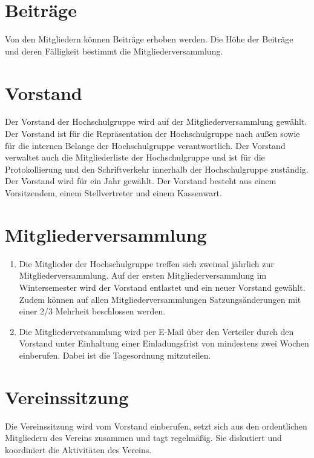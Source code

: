 \documentclass[a4paper]{scrartcl}
\begin{document}
\section{Beiträge}
Von den Mitgliedern können Beiträge erhoben werden. Die Höhe der Beiträge und
deren Fälligkeit bestimmt die Mitgliederversammlung.

\section{Vorstand}
Der Vorstand der Hochschulgruppe wird auf der Mitgliederversammlung gewählt.
Der Vorstand ist für die Repräsentation der Hochschulgruppe nach außen sowie
für die internen Belange der Hochschulgruppe verantwortlich. Der Vorstand
verwaltet auch die Mitgliederliste der Hochschulgruppe und ist für die
Protokollierung und den Schriftverkehr innerhalb der Hochschulgruppe zuständig.
Der Vorstand wird für ein Jahr gewählt. Der Vorstand besteht aus einem
Vorsitzendem, einem Stellvertreter und einem Kassenwart.

\section{Mitgliederversammlung}
\begin{enumerate}
    \item Die Mitglieder der Hochschulgruppe treffen sich zweimal jährlich zur
          Mitgliederversammlung. Auf der ersten Mitgliederversammlung im
          Wintersemester wird der Vorstand entlastet und ein neuer Vorstand
          gewählt. Zudem können auf allen Mitgliederversammlungen
          Satzungsänderungen mit einer 2/3 Mehrheit beschlossen werden.
    \item Die Mitgliederversammlung wird per E-Mail über den Verteiler
           durch den Vorstand unter Einhaltung einer
          Einladungsfrist von mindestens zwei Wochen einberufen. Dabei ist die
          Tagesordnung mitzuteilen.
\end{enumerate}

\section{Vereinssitzung}
Die Vereinssitzung wird vom Vorstand einberufen, setzt sich aus den
ordentlichen Mitgliedern des Vereins zusammen und tagt regelmäßig. Sie
diskutiert und koordiniert die Aktivitäten des Vereins.
\end{document}
